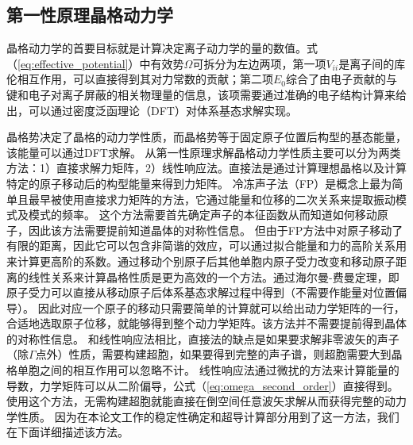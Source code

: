 \subsection{第一性原理晶格动力学}
晶格动力学的首要目标就是计算决定离子动力学的量的数值。式（\ref{eq:effective_potential}）中有效势$\Omega$可拆分为左边两项，第一项$V_{ii}$是离子间的库伦相互作用，可以直接得到其对力常数的贡献；第二项$E_0$综合了由电子贡献的与键和电子对离子屏蔽的相关物理量的信息，该项需要通过准确的电子结构计算来给出，可以通过密度泛函理论（DFT）对体系基态求解实现。

晶格势决定了晶格的动力学性质，而晶格势等于固定原子位置后构型的基态能量，该能量可以通过DFT求解。
从第一性原理求解晶格动力学性质主要可以分为两类方法\cite{fritsch1999density}：1）直接求解力矩阵，2）线性响应法。直接法是通过计算理想晶格以及计算特定的原子移动后的构型能量来得到力矩阵。
冷冻声子法（FP）是概念上最为简单且最早被使用直接求力矩阵的方法，它通过能量和位移的二次关系来提取振动模式及模式的频率\cite{yin1980microscopic}。
这个方法需要首先确定声子的本征函数从而知道如何移动原子，因此该方法需要提前知道晶体的对称性信息。
但由于FP方法中对原子移动了有限的距离，因此它可以包含非简谐的效应，可以通过拟合能量和力的高阶关系用来计算更高阶的系数。通过移动个别原子后其他单胞内原子受力改变和移动原子距离的线性关系来计算晶格性质是更为高效的一个方法。通过海尔曼-费曼定理，即原子受力可以直接从移动原子后体系基态求解过程中得到（不需要作能量对位置偏导）。
因此对应一个原子的移动只需要简单的计算就可以给出动力学矩阵的一行，合适地选取原子位移，就能够得到整个动力学矩阵。该方法并不需要提前得到晶体的对称性信息。
和线性响应法相比，直接法的缺点是如果要求解非零波矢的声子（除$\Gamma$点外）性质，需要构建超胞，如果要得到完整的声子谱，则超胞需要大到晶格单胞之间的相互作用可以忽略不计\cite{frank1995ab,kresse1995ab}。
线性响应法通过微扰的方法来计算能量的导数，力学矩阵可以从二阶偏导，公式（\ref{eq:omega_second_order}）直接得到。使用这个方法，无需构建超胞就能直接在倒空间任意波矢求解从而获得完整的动力学性质\cite{baroni2001phonons}。
因为在本论文工作的稳定性确定和超导计算部分用到了这一方法，我们在下面详细描述该方法。

